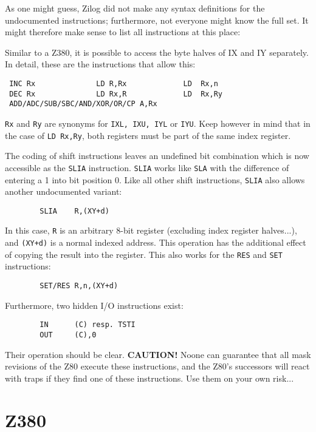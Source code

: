 \documentclass[12pt,twoside]{report}
\newcommand{\bb}[1]{{\bf #1}}
\newcommand{\tty}[1]{{\tt #1}}
\begin{document}
As one might guess, Zilog did not make any syntax definitions for the
undocumented instructions; furthermore, not everyone might know the
full set.  It might therefore make sense to list all instructions at
this place:

Similar to a Z380, it is possible to access the byte halves of IX and
IY separately.  In detail, these are the instructions that allow
this:
\begin{verbatim}
 INC Rx              LD R,Rx             LD  Rx,n
 DEC Rx              LD Rx,R             LD  Rx,Ry
 ADD/ADC/SUB/SBC/AND/XOR/OR/CP A,Rx 
\end{verbatim}
\tty{Rx} and \tty{Ry} are synonyms for \tty{IXL, IXU, IYL} or \tty{IYU}.
Keep however in mind that in the case of \tty{LD  Rx,Ry}, both registers
must be part of the same index register.

The coding of shift instructions leaves an undefined bit combination which
is now accessible as the \tty{SLIA} instruction.  \tty{SLIA} works like
\tty{SLA} with the difference of entering a 1 into bit position 0.  Like
all other shift instructions, \tty{SLIA} also allows another undocumented
variant:
\begin{verbatim}
        SLIA    R,(XY+d)                      
\end{verbatim}
In this case, \tty{R} is an arbitrary 8-bit register (excluding index
register halves...), and \tty{(XY+d)} is a normal indexed address.  This
operation has the additional effect of copying the result into the
register.  This also works for the \tty{RES} and \tty{SET} instructions:
\begin{verbatim}
        SET/RES R,n,(XY+d)                 
\end{verbatim}
Furthermore, two hidden I/O instructions exist:
\begin{verbatim}
        IN      (C) resp. TSTI
        OUT     (C),0
\end{verbatim}
Their operation should be clear.  \bb{CAUTION!}  Noone can
guarantee that all mask revisions of the Z80 execute these
instructions, and the Z80's successors will react with traps if they
find one of these instructions.  Use them on your own risk...


\section{Z380}
\end{document}
